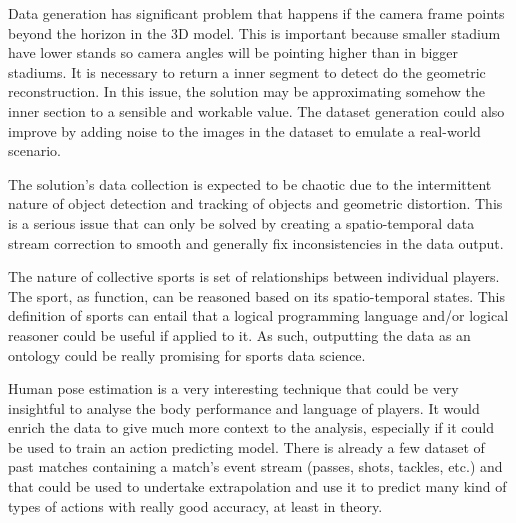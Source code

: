 \documentclass[
    11pt,
    twoside
]{report}
\begin{document}
Data generation has significant problem that happens if the camera frame points beyond the horizon in the 3D model. This is important because smaller stadium have lower stands so camera angles will be pointing higher than in bigger stadiums. It is necessary to return a inner segment to detect do the geometric reconstruction. In this issue, the solution may be approximating somehow the inner section to a sensible and workable value. The dataset generation could also improve by adding noise to the images in the dataset to emulate a real-world scenario.


The solution's data collection is expected to be chaotic due to the intermittent nature of object detection and tracking of objects and geometric distortion. This is a serious issue that can only be solved by creating a spatio-temporal data stream correction to smooth and generally fix inconsistencies in the data output.


The nature of collective sports is set of relationships between individual players. The sport, as function, can be reasoned based on its spatio-temporal states. This definition of sports can entail that a logical programming language and/or logical reasoner could be useful if applied to it. As such, outputting the data as an ontology could be really promising for sports data science.


Human pose estimation is a very interesting technique that could be very insightful to analyse the body performance and language of players. It would enrich the data to give much more context to the analysis, especially if it could be used to train an action predicting model. There is already a few dataset of past matches containing a match's event stream (passes, shots, tackles, etc.) and that could be used to undertake extrapolation and use it to predict many kind of types of actions with really good accuracy, at least in theory.
\end{document}
